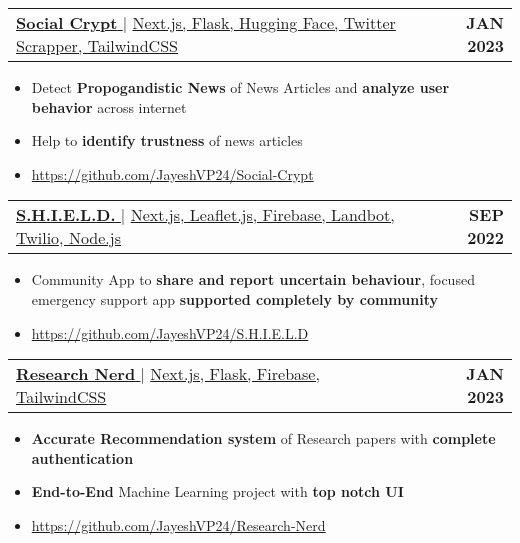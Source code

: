 \documentclass{article}
\makeatletter
\newcommand{\resumeItem}[1]{
  \item\small{
    {#1 \vspace{-2pt}}
  }
}
\newcommand{\resumeProjectHeading}[2]{
    \item
    \begin{tabular*}{1.001\textwidth}{l@{\extracolsep{\fill}}r}
      \small#1 & \textbf{\small #2}\\
    \end{tabular*}\vspace{-7pt}
}
\newcommand{\resumeItemListStart}{\begin{itemize}}
\newcommand{\resumeItemListEnd}{\end{itemize}\vspace{-5pt}}
\makeatother
\begin{document}
      \resumeProjectHeading
          {\href{https://github.com/JayeshVP24/Social-Crypt}{\textbf{\large{\underline{Social Crypt}}} \href{https://github.com/JayeshVP24/Social-Crypt}{\raisebox{-0.1\height}\faExternalLink }} $|$ \large{\underline{Next.js, Flask, Hugging Face, Twitter Scrapper, TailwindCSS}}}{JAN 2023}
          \resumeItemListStart
            \resumeItem{\normalsize{Detect \textbf{Propogandistic News} of News Articles and \textbf{analyze user behavior} across internet }}
            \resumeItem{\normalsize{Help to \textbf{identify trustness} of news articles }}
            \resumeItem{\normalsize\href{https://github.com/JayeshVP24/Social-Crypt}{https://github.com/JayeshVP24/Social-Crypt}} 
          \resumeItemListEnd
          \vspace{-13pt}
           \resumeProjectHeading
          {\href{http://shield-three.vercel.app/}{\textbf{\large{\underline{S.H.I.E.L.D.}}} \href{http://shield-three.vercel.app/}{\raisebox{-0.1\height}\faExternalLink }} $|$ \large{\underline{Next.js, Leaflet.js, Firebase, Landbot, Twilio, Node.js}}}{SEP 2022}
          \resumeItemListStart
            \resumeItem{\normalsize{Community App to \textbf{share and report uncertain behaviour}, focused emergency support app \textbf{supported completely by community}}}
            \resumeItem{\normalsize\href{https://github.com/JayeshVP24/S.H.I.E.L.D}{https://github.com/JayeshVP24/S.H.I.E.L.D}} 
          \resumeItemListEnd 
 \vspace{-13pt}
     \resumeProjectHeading
          {\href{https://github.com/JayeshVP24/Research-Nerd}{\textbf{\large{\underline{Research Nerd}}} \href{https://github.com/JayeshVP24/Research-Nerd}{\raisebox{-0.1\height}\faExternalLink }} $|$ \large{\underline{Next.js, Flask, Firebase, TailwindCSS}}}{JAN 2023}
          \resumeItemListStart
            \resumeItem{\normalsize{\textbf{Accurate Recommendation system} of Research papers with \textbf{complete authentication} }}
            \resumeItem{\normalsize{\textbf{End-to-End} Machine Learning project with \textbf{top notch UI}}}
            \resumeItem{\normalsize\href{https://github.com/JayeshVP24/Research-Nerd}{https://github.com/JayeshVP24/Research-Nerd}} 
          \resumeItemListEnd
     
\end{document}
